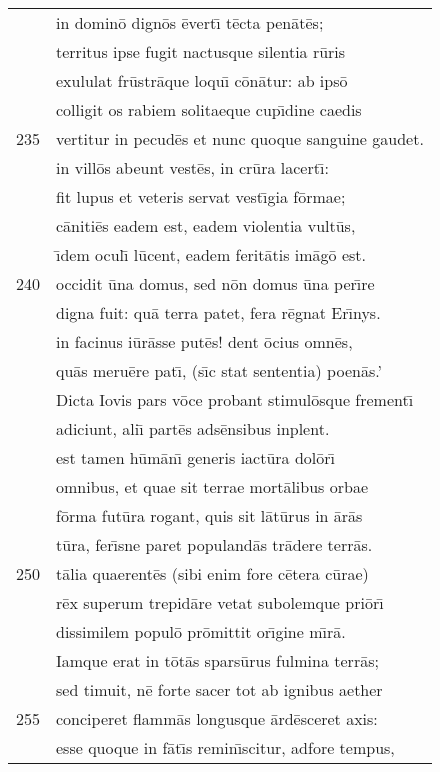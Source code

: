 \documentclass[paper=6in:9in,pagesize=pdftex,
               headinclude=on,footinclude=on,12pt]{scrbook}
\begin{document}
\begin{longtable}[p]{ r l }
 & in domin\=o dign\=os \=evert\={\i} t\=ecta pen\=at\=es;\\ 
 & territus ipse fugit nactusque silentia r\=uris\\ 
 & exululat fr\=ustr\=aque loqu\={\i} c\=on\=atur: ab ips\=o\\ 
 & colligit os rabiem solitaeque cup\={\i}dine caedis\\ 
235 & vertitur in pecud\=es et nunc quoque sanguine gaudet.\\ 
 & in vill\=os abeunt vest\=es, in cr\=ura lacert\={\i}:\\ 
 & fit lupus et veteris servat vest\={\i}gia f\=ormae;\\ 
 & c\=aniti\=es eadem est, eadem violentia vult\=us,\\ 
 & \={\i}dem ocul\={\i} l\=ucent, eadem ferit\=atis im\=ag\=o est.\\ 
240 & occidit \=una domus, sed n\=on domus \=una per\={\i}re\\ 
 & digna fuit: qu\=a terra patet, fera r\=egnat Er\={\i}nys.\\ 
 & in facinus i\=ur\=asse put\=es! dent \=ocius omn\=es,\\ 
 & qu\=as meru\=ere pat\={\i}, (s\={\i}c stat sententia) poen\=as.'\\ 
 & \indent Dicta Iovis pars v\=oce probant stimul\=osque frement\={\i}\\ 
 & adiciunt, ali\={\i} part\=es ads\=ensibus inplent.\\ 
 & est tamen h\=um\=an\={\i} generis iact\=ura dol\=or\={\i}\\ 
 & omnibus, et quae sit terrae mort\=alibus orbae\\ 
 & f\=orma fut\=ura rogant, quis sit l\=at\=urus in \=ar\=as\\ 
 & t\=ura, fer\={\i}sne paret populand\=as tr\=adere terr\=as.\\ 
250 & t\=alia quaerent\=es (sibi enim fore c\=etera c\=urae)\\ 
 & r\=ex superum trepid\=are vetat subolemque pri\=or\={\i}\\ 
 & dissimilem popul\=o pr\=omittit or\={\i}gine m\={\i}r\=a.\\ 
 & \indent Iamque erat in t\=ot\=as spars\=urus fulmina terr\=as;\\ 
 & sed timuit, n\=e forte sacer tot ab ignibus aether\\ 
255 & conciperet flamm\=as longusque \=ard\=esceret axis:\\ 
 & esse quoque in f\=at\={\i}s remin\={\i}scitur, adfore tempus,\\ 

\end{longtable}
\end{document}
